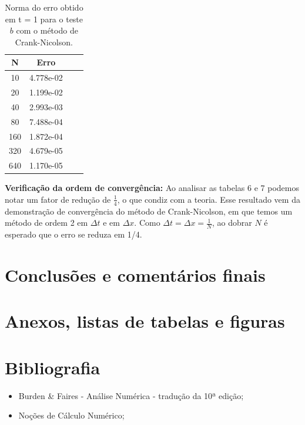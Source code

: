 \documentclass[a4paper, 12pt]{article}
\begin{document}
\begin{table}[!h]
    \centering
    \begin{tabular}{|c|c|c|c|}
    \hline                               %
    N & Erro \\
    \hline
    10  & 4.778e-02  \\
    20  & 1.199e-02  \\
    40  & 2.993e-03  \\
    80  & 7.488e-04  \\
    160 & 1.872e-04  \\
    320 & 4.679e-05  \\
    640 & 1.170e-05  \\
    \hline
    \end{tabular}
    \caption{Norma do erro obtido em t = 1 para o teste $b$ com o método de Crank-Nicolson.}
\end{table}

\textbf{Verificação da ordem de convergência:} Ao analisar as tabelas 6 e 7 podemos notar um fator de redução de $\frac{1}{4}$, o que condiz com a teoria. Esse resultado vem da demonstração de convergência do método de Crank-Nicolson, em que temos um método de ordem 2 em $\Delta t$ e em $\Delta x$. Como $\Delta t = \Delta x = \frac{1}{N}$, ao dobrar $N$ é esperado que o erro se reduza em 1/4. 

\section{Conclusões e comentários finais}





\section{Anexos, listas de tabelas e figuras}

\listoftables


\listoffigures


\section{Bibliografia}

\begin{itemize}
	
	
	\item Burden \& Faires - Análise Numérica - tradução da 10ª edição;
	
	\item Noções de Cálculo Numérico;

	
\end{itemize}
\end{document}
